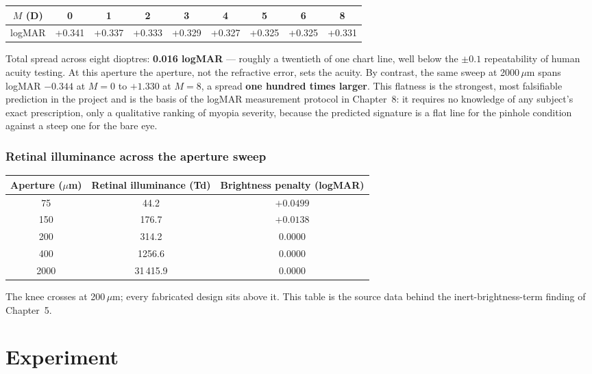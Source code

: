 \documentclass[11pt]{report}
\begin{document}
\begin{center}
\begin{tabular}{ccccccccc}
\toprule
$M$ (D) & 0 & 1 & 2 & 3 & 4 & 5 & 6 & 8 \\
\midrule
logMAR & +0.341 & +0.337 & +0.333 & +0.329 & +0.327 & +0.325 & +0.325 & +0.331 \\
\bottomrule
\end{tabular}
\end{center}
Total spread across eight dioptres: \textbf{0.016 logMAR} --- roughly a twentieth of one
chart line, well below the $\pm0.1$ repeatability of human acuity testing. At this aperture
the aperture, not the refractive error, sets the acuity. By contrast, the same sweep at
2000\,$\mu$m spans logMAR $-0.344$ at $M=0$ to $+1.330$ at $M=8$, a spread \textbf{one
hundred times larger}. This flatness is the strongest, most falsifiable prediction in the
project and is the basis of the logMAR measurement protocol in Chapter~8: it requires no
knowledge of any subject's exact prescription, only a qualitative ranking of myopia
severity, because the predicted signature is a flat line for the pinhole condition against
a steep one for the bare eye.

\section{Retinal illuminance across the aperture sweep}

\begin{center}
\begin{tabular}{ccc}
\toprule
Aperture ($\mu$m) & Retinal illuminance (Td) & Brightness penalty (logMAR) \\
\midrule
75 & 44.2 & $+0.0499$ \\
150 & 176.7 & $+0.0138$ \\
200 & 314.2 & $0.0000$ \\
400 & 1256.6 & $0.0000$ \\
2000 & 31\,415.9 & $0.0000$ \\
\bottomrule
\end{tabular}
\end{center}
The knee crosses at 200\,$\mu$m; every fabricated design sits above it. This table is the
source data behind the inert-brightness-term finding of Chapter~5.

\part{Experiment}
\end{document}
